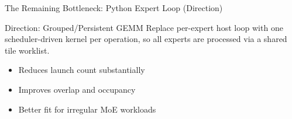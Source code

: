 \documentclass[aspectratio=169,11pt]{beamer}
\begin{document}
\begin{frame}[t]{The Remaining Bottleneck: Python Expert Loop (Direction)}
\small
\begin{exampleblock}{Direction: Grouped/Persistent GEMM}
Replace per-expert host loop with one scheduler-driven kernel per operation,
so all experts are processed via a shared tile worklist.
\end{exampleblock}

\begin{itemize}
    \item Reduces launch count substantially
    \item Improves overlap and occupancy
    \item Better fit for irregular MoE workloads
\end{itemize}
\end{frame}
\end{document}
